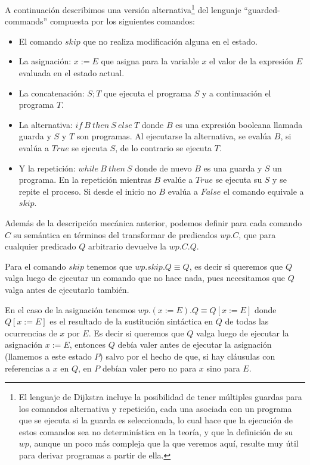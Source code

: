 \documentclass[12pt, a4paper, openany, fleqn]{book}
\begin{document}
    A continuación describimos una versión alternativa\footnote{El lenguaje de Dijkstra incluye la posibilidad de tener múltiples guardas para los comandos alternativa y repetición, cada una asociada con un programa que se ejecuta si la guarda es seleccionada, lo cual hace que la ejecución de estos comandos sea no determinística en la teoría, y que la definición de su $wp$, aunque un poco más compleja que la que veremos aquí, resulte muy útil para derivar programas a partir de ella.} del lenguaje ``guarded-commands'' compuesta por los siguientes comandos:
    \begin{itemize}
        \item El comando $skip$ que no realiza modificación alguna en el estado.
        \item La asignación: $x := E$ que asigna para la variable $x$ el valor de la expresión $E$ evaluada en el estado actual.
        \item La concatenación: $S;T$ que ejecuta el programa $S$ y a continuación el programa $T$.
        \item La alternativa: $if\ B\ then\ S\ else\ T$ donde $B$ es una expresión booleana llamada guarda y $S$ y $T$ son programas. Al ejecutarse la alternativa, se evalúa $B$, si evalúa a $True$ se ejecuta $S$, de lo contrario se ejecuta $T$.
        \item Y la repetición: $while\ B\ then\ S$ donde de nuevo $B$ es una guarda y $S$ un programa. En la repetición mientras $B$ evalúe a $True$ se ejecuta su $S$ y se repite el proceso. Si desde el inicio no $B$ evalúa a $False$ el comando equivale a $skip$.
    \end{itemize}

    Además de la descripción mecánica anterior, podemos definir para cada comando $C$ su semántica en términos del transformar de predicados $wp.C$, que para cualquier predicado $Q$ arbitrario devuelve la $wp.C.Q$.

    Para el comando $skip$ tenemos que $wp.skip.Q \equiv Q$, es decir si queremos que $Q$ valga luego de ejecutar un comando que no hace nada, pues necesitamos que $Q$ valga antes de ejecutarlo también.

    En el caso de la asignación tenemos $wp.(x:=E).Q \equiv Q[x:=E]$ donde $Q[x:=E]$ es el resultado de la sustitución sintáctica en $Q$ de todas las ocurrencias de $x$ por $E$. Es decir si queremos que $Q$ valga luego de ejecutar la asignación $x:=E$, entonces $Q$ debía valer antes de ejecutar la asignación (llamemos a este estado $P$) salvo por el hecho de que, si hay cláusulas con referencias a $x$ en $Q$, en $P$ debían valer pero no para $x$ sino para $E$.
\end{document}
